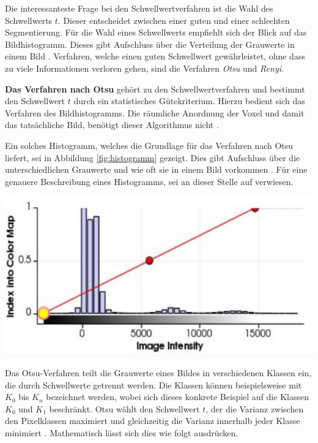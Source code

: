 Die interessanteste Frage bei den Schwellwertverfahren ist die Wahl des
Schwellwerts $t$. Dieser entscheidet zwischen einer guten und einer schlechten Segmentierung.
Für die Wahl eines Schwellwerts empfiehlt sich der Blick auf das Bildhistogramm.
Dieses gibt Aufschluss über die Verteilung der Grauwerte in einem Bild \citep[vgl.][S.~361]{lehmann2013bildverarbeitung}.
Verfahren, welche einen guten Schwellwert gewährleistet, ohne dass zu viele Informationen
verloren gehen, sind die Verfahren \textit{Otsu} und \textit{Renyi}.

\pagebreak

\textbf{Das Verfahren nach Otsu} gehört zu den Schwellwertverfahren und bestimmt
den Schwellwert $t$ durch ein statistisches Gütekriterium. Hierzu bedient sich das
Verfahren des Bildhistogramms. Die räumliche Anordnung der Voxel und damit das
tatsächliche Bild, benötigt dieser Algorithmus nicht \citep[vgl.][S.~264]{lehmann2013bildverarbeitung}.

\begin{minipage}{0.40\textwidth}
	Ein solches Histogramm, welches die Grundlage für das Verfahren nach Otsu
	liefert, sei in Abbildung \ref{fig:histogramm} gezeigt. Dies gibt Aufschluss
	über die unterschiedlichen Grauwerte und wie oft sie in einem Bild vorkommen
	\citep[vgl.][S.~264]{lehmann2013bildverarbeitung}. Für eine genauere
	Beschreibung eines Histogramms, sei an dieser Stelle auf \citet[S.~42]{burger2009}
	verwiesen.
\end{minipage}
\hfill
\begin{minipage}{0.50\textwidth}
	\centering
	\includegraphics[width=1\textwidth]{img/histogramm.jpg}
	\label{fig:histogramm}
\end{minipage}

Das Otsu-Verfahren teilt die Grauwerte eines Bildes in verschiedenen Klassen ein,
die durch Schwellwerte getrennt werden. Die Klassen können beispielsweise mit $K_{0}$
bis $K_{n}$ bezeichnet werden, wobei sich dieses konkrete Beispiel auf die
Klassen $K_{0}$ und $K_{1}$ beschränkt. Otsu wählt den Schwellwert $t$, der die
Varianz zwischen den Pixelklassen maximiert und gleichzeitig die Varianz
innerhalb jeder Klasse minimiert \citep[vgl.][S.~264]{lehmann2013bildverarbeitung}.
Mathematisch lässt sich dies wie folgt ausdrücken.

